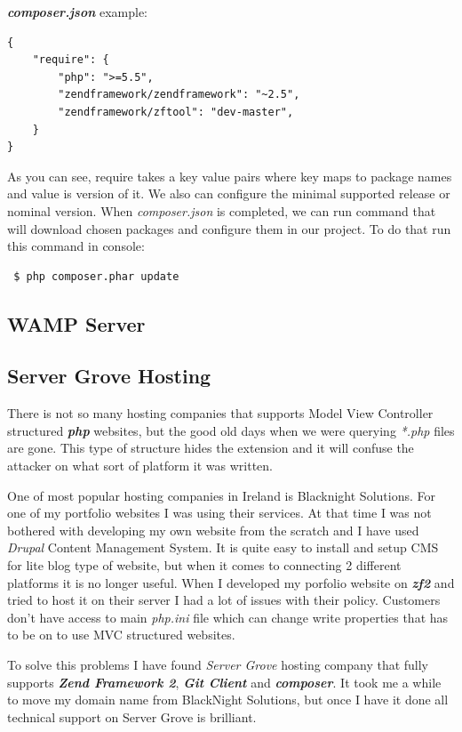 \textbf{\textit{composer.json}} example:

\begin{verbatim}
{
    "require": {
        "php": ">=5.5",
        "zendframework/zendframework": "~2.5",
        "zendframework/zftool": "dev-master",
    }
}
\end{verbatim}

As you can see, require takes a key value pairs where key maps to package names and value is version of it. We also can configure the minimal supported release or nominal version. When \textit{composer.json} is completed, we can run command that will download chosen packages and configure them in our project. To do that run this command in console:
\begin{verbatim}
 $ php composer.phar update
\end{verbatim}

    \subsection{WAMP Server}

    \subsection{Server Grove Hosting}
There is not so many hosting companies that supports Model View Controller structured \textbf{\textit{php}} websites, but the good old days when we were querying \textit{*.php} files are gone. This type of structure hides the extension and it will confuse the attacker on what sort of platform it was written.

One of most popular hosting companies in Ireland is Blacknight Solutions. For one of my portfolio websites I was using their services. At that time I was not bothered with developing my own website from the scratch and I have used \textit{Drupal} Content Management System. It is quite easy to install and setup CMS for lite blog type of website, but when it comes to connecting 2 different platforms it is no longer useful. When I developed my porfolio website on \textbf{\textit{zf2}} and tried to host it on their server I had a lot of issues with their policy. Customers don't have access to main \textit{php.ini} file which can change write properties that has to be on to use MVC structured websites. 

To solve this problems I have found \textit{Server Grove} hosting company that fully supports \textbf{\textit{Zend Framework 2}}, \textbf{\textit{Git Client}} and  \textbf{\textit{composer}}. It took me a while to move my domain name from BlackNight Solutions, but once I have it done all technical support on Server Grove is brilliant.



